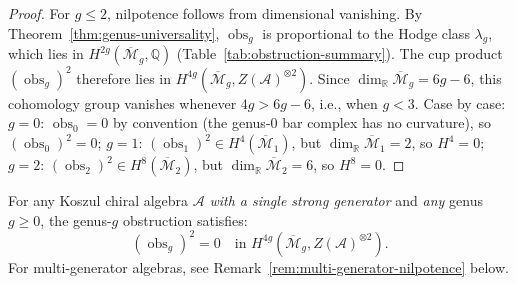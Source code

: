 \begin{proof}
For $g \leq 2$, nilpotence follows from dimensional vanishing.
By Theorem~\ref{thm:genus-universality}, $\operatorname{obs}_g$ is
proportional to the Hodge class $\lambda_g$, which lies in
$H^{2g}(\overline{\mathcal{M}}_g, \mathbb{Q})$
(Table~\ref{tab:obstruction-summary}).  The cup product
$(\operatorname{obs}_g)^2$ therefore lies in
$H^{4g}(\overline{\mathcal{M}}_g, Z(\mathcal{A})^{\otimes 2})$.
Since $\dim_{\mathbb{R}} \overline{\mathcal{M}}_g = 6g - 6$, this
cohomology group vanishes whenever $4g > 6g - 6$, i.e., when
$g < 3$.
Case by case:
$g = 0$: $\operatorname{obs}_0 = 0$ by convention (the genus-$0$ bar complex has no curvature), so $(\operatorname{obs}_0)^2 = 0$;
$g = 1$: $(\operatorname{obs}_1)^2 \in H^4(\overline{\mathcal{M}}_1)$,
but $\dim_{\mathbb{R}} \overline{\mathcal{M}}_1 = 2$, so $H^4 = 0$;
$g = 2$: $(\operatorname{obs}_2)^2 \in H^8(\overline{\mathcal{M}}_2)$,
but $\dim_{\mathbb{R}} \overline{\mathcal{M}}_2 = 6$, so $H^8 = 0$.
\end{proof}

\begin{theorem}
\label{thm:obstruction-nilpotent-all-genera}
\label{thm:obstruction-nilpotent-higher}%
For any Koszul chiral algebra $\mathcal{A}$ \emph{with a single strong
generator} and \emph{any} genus $g \geq 0$,
the genus-$g$ obstruction satisfies:
\begin{equation}\label{eq:obs-squared-zero-all-genera}
(\operatorname{obs}_g)^2 = 0 \quad \text{in }
H^{4g}(\overline{\mathcal{M}}_g, Z(\mathcal{A})^{\otimes 2}).
\end{equation}
For multi-generator algebras, see
Remark~\textup{\ref{rem:multi-generator-nilpotence}} below.
\end{theorem}

